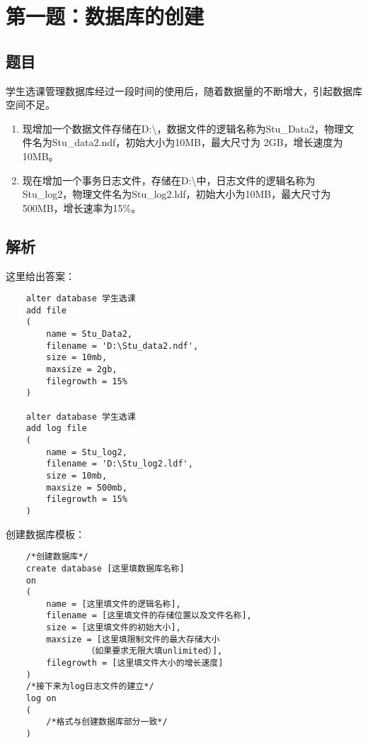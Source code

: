 \section{第一题：数据库的创建}

\subsection{题目}

\qquad 学生选课管理数据库经过一段时间的使用后，随着数据量的不断增大，引起数据库空间不足。

\begin{enumerate}
  \item 现增加一个数据文件存储在D:\textbackslash，数据文件的逻辑名称为Stu\_Data2，物理文件名为Stu\_data2.ndf，初始大小为10MB，最大尺寸为 2GB，增长速度为10MB。
  \item 现在增加一个事务日志文件，存储在D:\textbackslash 中，日志文件的逻辑名称为Stu\_log2，物理文件名为Stu\_log2.ldf，初始大小为10MB，最大尺寸为500MB，增长速率为15\%。
\end{enumerate}

\subsection{解析}

\qquad 这里给出答案：

\begin{mdframed}[backgroundcolor=blue!5]

\begin{verbatim}
    alter database 学生选课
    add file
    (
        name = Stu_Data2,
        filename = 'D:\Stu_data2.ndf',
        size = 10mb,
        maxsize = 2gb,
        filegrowth = 15%
    )

    alter database 学生选课
    add log file
    (
        name = Stu_log2,
        filename = 'D:\Stu_log2.ldf',
        size = 10mb,
        maxsize = 500mb,
        filegrowth = 15%
    )
\end{verbatim}

\end{mdframed}

\qquad 创建数据库模板：

\begin{mdframed}[backgroundcolor=gray!10]
\begin{verbatim}
    /*创建数据库*/
    create database [这里填数据库名称]
    on
    (
        name = [这里填文件的逻辑名称],
        filename = [这里填文件的存储位置以及文件名称],
        size = [这里填文件的初始大小],
        maxsize = [这里填限制文件的最大存储大小
                （如果要求无限大填unlimited）],
        filegrowth = [这里填文件大小的增长速度]
    )
    /*接下来为log日志文件的建立*/
    log on
    (
        /*格式与创建数据库部分一致*/
    )
\end{verbatim}
\end{mdframed}

